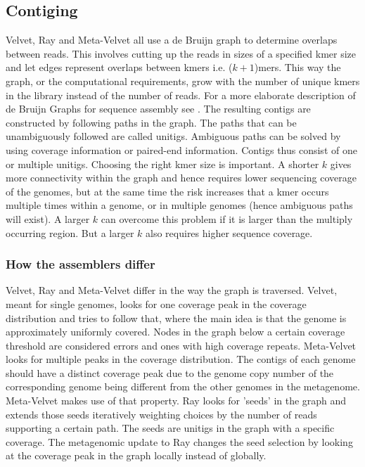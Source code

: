 \documentclass[a4paper,12pt]{report}
\begin{document}
\subsection{Contiging}
Velvet, Ray and Meta-Velvet all use a de Bruijn graph to determine overlaps
between reads. This involves cutting up the reads in sizes of a specified kmer
size and let edges represent overlaps between kmers i.e. ($k+1$)mers. This way
the graph, or the computational requirements, grow with the number of unique
kmers in the library instead of the number of reads. For a more elaborate
description of de Bruijn Graphs for sequence assembly see
\cite{Miller20211242}. The resulting contigs are constructed by following paths
in the graph. The paths that can be unambiguously followed are called unitigs.
Ambiguous paths can be solved by using coverage information or paired-end
information. Contigs thus consist of one or multiple unitigs. Choosing the
right kmer size is important. A shorter $k$ gives more connectivity within the
graph and hence requires lower sequencing coverage of the genomes, but at the same
time the risk increases that a kmer occurs multiple times within a genome,
or in multiple genomes (hence ambiguous paths will exist). A larger $k$ can overcome this problem if it is larger
than the multiply occurring region. But a larger $k$ also requires higher
sequence coverage.\\


\subsubsection{How the assemblers differ}
Velvet, Ray and Meta-Velvet differ in the way the graph is traversed. Velvet,
meant for single genomes, looks for one coverage peak in the coverage
distribution and tries to follow that, where the main idea is that the genome
is approximately uniformly covered. Nodes in the graph below a certain coverage
threshold are considered errors and ones with high coverage repeats.
Meta-Velvet looks for multiple peaks in the coverage distribution. The contigs
of each genome
should have a distinct coverage peak due to the genome copy number of the
corresponding genome being different from the other genomes in the metagenome. Meta-Velvet
makes use of that property. Ray looks for 'seeds' in the graph and extends
those seeds iteratively weighting choices by the number of reads supporting a
certain path. The seeds are unitigs in the graph with a specific coverage. The
metagenomic update to Ray changes the seed selection by looking at the coverage
peak in the graph locally instead of globally. 
\end{document}
